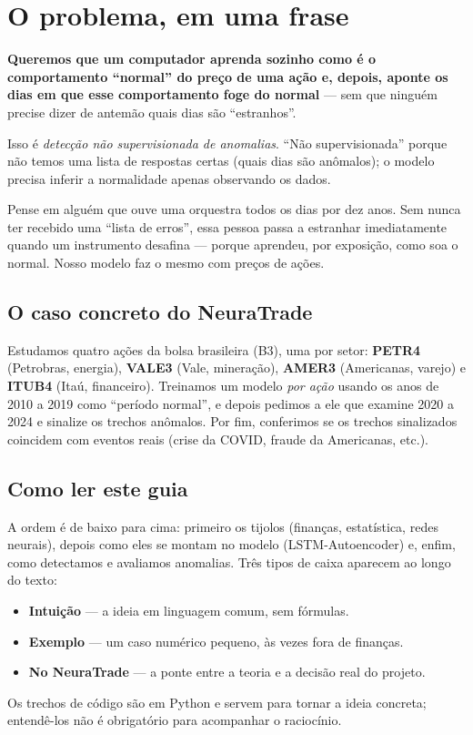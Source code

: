\section{O problema, em uma frase}
\label{sec:intro}

\textbf{Queremos que um computador aprenda sozinho como é o comportamento
``normal'' do preço de uma ação e, depois, aponte os dias em que esse
comportamento foge do normal} --- sem que ninguém precise dizer de antemão
quais dias são ``estranhos''.

Isso é \emph{detecção não supervisionada de anomalias}. ``Não supervisionada''
porque não temos uma lista de respostas certas (quais dias são anômalos);
o modelo precisa inferir a normalidade apenas observando os dados.

\begin{intuicao}
Pense em alguém que ouve uma orquestra todos os dias por dez anos. Sem nunca
ter recebido uma ``lista de erros'', essa pessoa passa a estranhar
imediatamente quando um instrumento desafina --- porque aprendeu, por
exposição, como soa o normal. Nosso modelo faz o mesmo com preços de ações.
\end{intuicao}

\subsection{O caso concreto do NeuraTrade}
Estudamos quatro ações da bolsa brasileira (B3), uma por setor:
\textbf{PETR4} (Petrobras, energia), \textbf{VALE3} (Vale, mineração),
\textbf{AMER3} (Americanas, varejo) e \textbf{ITUB4} (Itaú, financeiro).
Treinamos um modelo \emph{por ação} usando os anos de 2010 a 2019 como
``período normal'', e depois pedimos a ele que examine 2020 a 2024 e sinalize
os trechos anômalos. Por fim, conferimos se os trechos sinalizados coincidem
com eventos reais (crise da COVID, fraude da Americanas, etc.).

\subsection{Como ler este guia}
A ordem é de baixo para cima: primeiro os tijolos (finanças, estatística,
redes neurais), depois como eles se montam no modelo (LSTM-Autoencoder) e,
enfim, como detectamos e avaliamos anomalias. Três tipos de caixa aparecem ao
longo do texto:

\begin{itemize}[noitemsep]
  \item \textbf{Intuição} --- a ideia em linguagem comum, sem fórmulas.
  \item \textbf{Exemplo} --- um caso numérico pequeno, às vezes fora de finanças.
  \item \textbf{No NeuraTrade} --- a ponte entre a teoria e a decisão real do projeto.
\end{itemize}

\noindent Os trechos de código são em Python e servem para tornar a ideia
concreta; entendê-los não é obrigatório para acompanhar o raciocínio.
